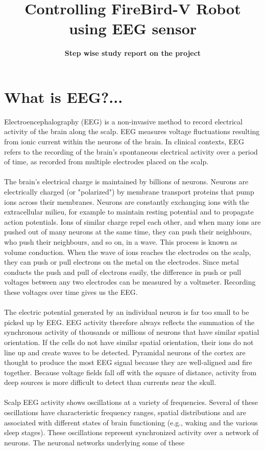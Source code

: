 \documentclass[a4 paper,12pt]{article}
\title{\bfseries\Huge Controlling FireBird-V Robot using EEG sensor}
\author{\textbf{Step wise study report on the project}}
\date{}
\begin{document}
	\begin{minipage}{0.95\textwidth}
		\begingroup
		\let\endcenter\endflushleft
		\maketitle
		\endgroup
	\end{minipage}
	

\begin{minipage}{0.98\textwidth}
		\section{What is EEG?...}
		\vspace{-0.1in}
		Electroencephalography (EEG) is a non-invasive method to record electrical activity of the brain along the scalp. EEG measures voltage fluctuations resulting from ionic current within the neurons of the brain. In clinical contexts, EEG refers to the recording of the brain's spontaneous electrical activity over a period of time, as recorded from multiple electrodes placed on the scalp.\\\\The brain's electrical charge is maintained by billions of neurons. Neurons are electrically charged (or "polarized") by membrane transport proteins that pump ions across their membranes. Neurons are constantly exchanging ions with the extracellular milieu, for example to maintain resting potential and to propagate action potentials. Ions of similar charge repel each other, and when many ions are pushed out of many neurons at the same time, they can push their neighbours, who push their neighbours, and so on, in a wave. This process is known as volume conduction. When the wave of ions reaches the electrodes on the scalp, they can push or pull electrons on the metal on the electrodes. Since metal conducts the push and pull of electrons easily, the difference in push or pull voltages between any two electrodes can be measured by a voltmeter. Recording these voltages over time gives us the EEG.\\\\The electric potential generated by an individual neuron is far too small to be picked up by EEG. EEG activity therefore always reflects the summation of the synchronous activity of thousands or millions of neurons that have similar spatial orientation. If the cells do not have similar spatial orientation, their ions do not line up and create waves to be detected. Pyramidal neurons of the cortex are thought to produce the most EEG signal because they are well-aligned and fire together. Because voltage fields fall off with the square of distance, activity from deep sources is more difficult to detect than currents near the skull.\\\\Scalp EEG activity shows oscillations at a variety of frequencies. Several of these oscillations have characteristic frequency ranges, spatial distributions and are associated with different states of brain functioning (e.g., waking and the various sleep stages). These oscillations represent synchronized activity over a network of neurons. The neuronal networks underlying some of these 
\end{minipage}
\end{document}
